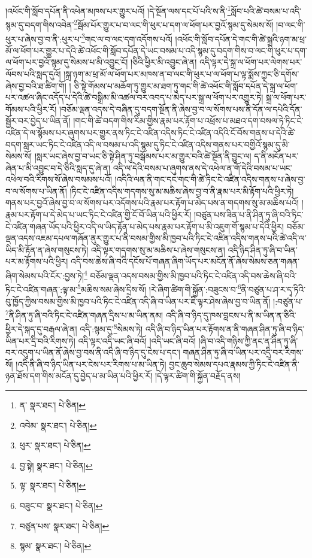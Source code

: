 །འཕོང་གི་སློབ་དཔོན་ནི་འཕེན་མཁས་པར་གྱུར་པའོ། །དེ་སྔོན་ལས་དང་པོ་པའི་ས་ནི་\footnote{ན་  སྣར་ཐང་།  པེ་ཅིན། }སློབ་པའི་ཚེ་བསམ་པ་འདི་སྙམ་དུ་བདག་གིས་འབེན་\footnote{འབེམ་  སྣར་ཐང་།  པེ་ཅིན། }སྦོམ་པོར་གྱུར་པ་བ་ལང་གི་ཕུར་པ་དག་ལ་ཕོག་པར་བྱའོ་སྙམ་དུ་སེམས་སོ། །བ་ལང་གི་ཕུར་པ་ཞེས་བྱ་བ་ནི་:ཕུར་པ་\footnote{ཕུར་  སྣར་ཐང་།  པེ་ཅིན། }གང་ལ་བ་ལང་དག་འདོགས་པའོ། །འཕོང་གི་སློབ་དཔོན་དེ་གང་གི་ཚེ་སྐྲའི་ཉག་མ་ཕྲ་མོ་ལ་ཕོག་པར་གྱུར་པ་དེའི་ཚེ་འཕོང་གི་སློབ་དཔོན་དེ་ཡང་བསམ་པ་འདི་སྙམ་དུ་བདག་གིས་བ་ལང་གི་ཕུར་པ་དག་ལ་ཕོག་པར་བྱའོ་སྙམ་དུ་སེམས་པ་མི་འབྱུང་ངོ། །ཅིའི་ཕྱིར་མི་འབྱུང་ཞེ་ན། འདི་ལྟར་དེ་སྐྲ་ལ་ཕོག་པར་ལེགས་པར་ལོབས་པའི་སླད་དུའོ། །སྐྲ་ཉག་མ་ཕྲ་མོ་ལ་ཕོག་པར་མཁས་ན་བ་ལང་གི་ཕུར་པ་ལ་ཕོག་པ་ལྟ་སྨོས་ཀྱང་ཅི་དགོས་ཞེས་བྱ་བའི་ཐ་ཚིག་གོ། །
ཅི་སྟེ་གོམས་པ་མཆོག་ཏུ་གྱུར་མ་ཐག་ཏུ་གང་གི་ཚེ་འཕོང་གི་སློབ་དཔོན་དེ་སྐྲ་ལ་ཕོག་པར་འཚལ་ཞིང་འདོད་པ་དེའི་ཚེ་བསྒྲིམ་མི་འཚལ་བར་འབད་པ་མེད་པར་སྐྲ་ལ་ཕོག་པར་འགྱུར་ཏེ། སྐྲ་ལ་ཕོག་པར་གོམས་པའི་ཕྱིར་རོ། །བཅོམ་ལྡན་འདས་དེ་བཞིན་དུ་བདག་སྔོན་ནི་ཞེས་བྱ་བ་ལ་སོགས་པས་ནི་དོན་ལ་དཔེའི་དོན་སྦྱོར་བར་བྱེད་པ་ཡིན་ནོ། །གང་གི་ཚེ་བདག་གིས་རིམ་གྱིས་རྣམ་པར་རྟོག་པ་འཕྲོས་པ་མཐའ་དག་བསལ་ཏེ་ཏིང་ངེ་འཛིན་དེ་ལ་སྙོམས་པར་ཞུགས་པར་གྱུར་ནས་ཏིང་ངེ་འཛིན་འདིས་ཏིང་ངེ་འཛིན་འདིའི་ངོ་བོས་གནས་པ་དེའི་ཚེ་བདག་སླར་ཡང་ཏིང་ངེ་འཛིན་འདི་ལ་བསམ་པ་འདི་སྙམ་དུ་ཏིང་ངེ་འཛིན་འདིས་གནས་པར་བགྱིའོ་སྙམ་དུ་མི་སེམས་སོ། །སླར་ཡང་ཞེས་བྱ་བ་ཡང་ཅི་སྟེ་ཤིན་ཏུ་བསྒོམས་པར་མ་གྱུར་བའི་ཚེ་སྔོན་ནི་བྱུང་ལ། ད་ནི་མངོན་པར་ཞེན་པ་མི་འབྱུང་བ་དེ་ཅིའི་སླད་དུ་ཞེ་ན། འདི་ལ་དེའི་བསམ་པ་ཞུགས་ནས་དེ་འཕེལ་ན་གོ་དེའི་བསམ་པ་ཡང་འཕེལ་བའི་རིགས་སོ་ཞེས་བསམས་པའོ། །འདིའི་ལན་ནི་གང་དང་གང་གི་ཚེ་ཏིང་ངེ་འཛིན་འདིས་གནས་པ་ཞེས་བྱ་བ་ལ་སོགས་པ་ཡིན་ནོ། །ཏིང་ངེ་འཛིན་འདིས་གདགས་སུ་མ་མཆིས་ཞེས་བྱ་བ་ནི་རྣམ་པར་མི་རྟོག་པའི་ཕྱིར་ཏེ། གནས་པར་བྱའོ་ཞེས་བྱ་བ་ལ་སོགས་པར་འདོགས་པའི་རྣམ་པར་རྟོག་པ་མེད་པས་ན་གདགས་སུ་མ་མཆིས་པའོ། །རྣམ་པར་རྟོག་པ་དེ་མེད་པ་ཡང་ཏིང་ངེ་འཛིན་གྱི་ངོ་བོ་ཡིན་པའི་ཕྱིར་རོ། །བཙུན་པས་ཟིན་པ་ནི་ཤིན་ཏུ་ཞི་བའི་ཏིང་ངེ་འཛིན་གཞན་ཡོད་པའི་ཕྱིར་འདི་ལ་ཡིད་རྟོན་པ་མེད་པས་རྣམ་པར་རྟོག་པ་མི་འཇུག་གོ་སྙམ་པ་དེའི་ཕྱིར། བཅོམ་ལྡན་འདས་འཇམ་དཔལ་གཞོན་ནུར་གྱུར་པ་ནི་བསམ་གྱིས་མི་ཁྱབ་པའི་ཏིང་ངེ་འཛིན་འདིས་གནས་པའི་ཚེ་འདི་ལ་ཡིད་མི་རྟོན་ན་ཞེས་གསུངས་ཏེ། འདི་ལྟར་གདགས་སུ་མ་མཆིས་པ་ཞེས་གསུངས་ན། འདི་ཉིད་ཤིན་ཏུ་ཞི་བ་ཡིན་པར་མ་རྟོགས་པའི་ཕྱིར། འདི་བས་ཆེས་ཞི་བའི་དངོས་པོ་གཞན་ཞིག་ཡོད་པར་མངོན་ནོ་ཞེས་སེམས་ཅན་གཞན་ཞིག་སེམས་པའི་ངོར་:བྱས་ཏེ།\footnote{བྱ་སྟེ།  སྣར་ཐང་།  པེ་ཅིན། } བཅོམ་ལྡན་འདས་བསམ་གྱིས་མི་ཁྱབ་པའི་ཏིང་ངེ་འཛིན་འདི་བས་ཆེས་ཞི་བའི་ཏིང་ངེ་འཛིན་གཞན་:ལྟ་མ་\footnote{ལྟ་  སྣར་ཐང་།  པེ་ཅིན། }མཆིས་སམ་ཞེས་དྲིས་སོ། །རེ་ཞིག་ཚིག་གི་སྐྱོན་:བཟུངས་བ་\footnote{བཟུང་བ་  སྣར་ཐང་།  པེ་ཅིན། }ནི་བཙུན་པ་ཤ་ར་དྭ་ཏིའི་བུ་ཁྱོད་ཀྱིས་བསམ་གྱིས་མི་ཁྱབ་པའི་ཏིང་ངེ་འཛིན་འདི་ཞི་བ་ཡིན་པར་ཇི་ལྟར་ཤེས་ཞེས་བྱ་བ་ཡིན་ནོ། །:བཙུན་པ་\footnote{བཙུན་པས་  སྣར་ཐང་།  པེ་ཅིན། }ནི་ཤིན་ཏུ་ཞི་བའི་ཏིང་ངེ་འཛིན་གཞན་དྲིས་པ་མ་ཡིན་ནམ། འདི་ཞི་བ་ཉིད་དུ་ཁས་བླངས་པ་ནི་མ་ཡིན་ན་ཅིའི་ཕྱིར་དེ་སྐད་དུ་བརྒལ་ཞེ་ན། འདི་:སྙམ་དུ་\footnote{སྙམ་  སྣར་ཐང་།  པེ་ཅིན། }སེམས་ཏེ། འདི་ཞི་བ་ཉིད་ཡིན་པར་རྟོགས་ན་ནི་གཞན་ཤིན་ཏུ་ཞི་བ་ཉིད་ཡིན་པར་དྲི་བའི་རིགས་ཏེ། འདི་ལྟར་འདི་ཡང་ཞི་བའོ། །འདི་ཡང་ཞི་བའོ། །ཞི་བ་འདི་གཉིས་ཀྱི་ནང་ན་ཤིན་ཏུ་ཞི་བར་འདུག་པ་ཡིན་ནོ་ཞེས་བྱ་བས་ནི་འདི་ཞི་བ་ཉིད་དུ་ངེས་པ་དང་། གཞན་ཤིན་ཏུ་ཞི་བ་ཡིན་པར་འདྲི་བར་རིགས་སོ། །འདི་ནི་ཞི་བ་ཉིད་ཡིན་པར་ངེས་པར་རིགས་པ་མ་ཡིན་ཏེ། བྱང་ཆུབ་སེམས་དཔའ་རྣམས་ཀྱི་ཏིང་ངེ་འཛིན་ནི་ཉན་ཐོས་དག་གིས་མངོན་དུ་བྱེད་པ་མ་ཡིན་པའི་ཕྱིར་རོ། །དེ་ལྟར་ཚིག་གི་སྐྱོན་བརྗོད་ནས། 